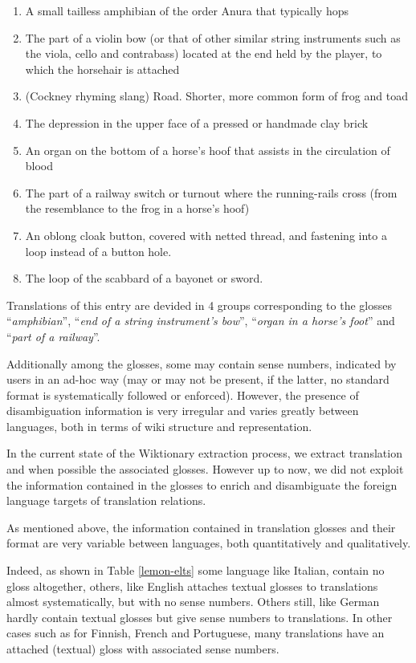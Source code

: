 \documentclass[10pt, a4paper]{article}
\begin{document}
\begin{small}\begin{enumerate}
\item A small tailless amphibian of the order Anura that typically hops
\item The part of a violin bow (or that of other similar string instruments such as the viola, cello and contrabass) located at the end held by the player, to which the horsehair is attached
\item (Cockney rhyming slang) Road. Shorter, more common form of frog and toad
\item The depression in the upper face of a pressed or handmade clay brick
\item An organ on the bottom of a horse’s hoof that assists in the circulation of blood
\item The part of a railway switch or turnout where the running-rails cross (from the resemblance to the frog in a horse’s hoof)
\item An oblong cloak button, covered with netted thread, and fastening into a loop instead of a button hole.
\item The loop of the scabbard of a bayonet or sword. 
\end{enumerate}\end{small}

Translations of this entry are devided in 4 groups corresponding to the glosses ``\emph{amphibian}'', ``\emph{end of a string instrument’s bow}'', ``\emph{organ in a horse’s foot}'' and ``\emph{part of a railway}''. 

Additionally among the glosses, some may contain sense numbers, indicated by users in an ad-hoc way (may or may not be present, if the latter, no standard format is systematically followed or enforced). However, the presence of disambiguation information is very irregular and varies greatly between languages, both in terms of wiki structure and representation.

In the current state of the Wiktionary extraction process, we extract translation and when possible the associated glosses. However up to now, we did not exploit the information contained in the glosses to enrich and disambiguate the foreign language targets of translation relations.

As mentioned above, the information contained in translation glosses and their format are very variable between languages, both quantitatively and qualitatively. 

Indeed, as shown in Table \ref{lemon-elts} some language like Italian, contain no gloss altogether, others, like English attaches textual glosses to translations almost systematically, but with no sense numbers. Others still, like German hardly contain textual glosses but give sense numbers to translations. In other cases such as for Finnish, French and Portuguese, many translations have an attached (textual) gloss with associated sense numbers. 
\end{document}
